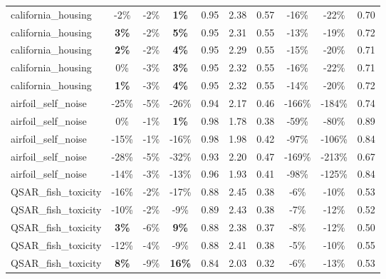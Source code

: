 \begin{table}[!htbp]
\begin{small}
\begin{sc}
{\begin{tabular}{lccccccccc}
california\_housing & -2\% & -2\% & \textbf{1\%} & 0.95 & 2.38 & 0.57 & -16\% & -22\% & 0.70 \\
california\_housing & \textbf{3\%} & -2\% & \textbf{5\%} & 0.95 & 2.31 & 0.55 & -13\% & -19\% & 0.72 \\
california\_housing & \textbf{2\%} & -2\% & \textbf{4\%} & 0.95 & 2.29 & 0.55 & -15\% & -20\% & 0.71 \\
california\_housing & 0\% & -3\% & \textbf{3\%} & 0.95 & 2.32 & 0.55 & -16\% & -22\% & 0.71 \\
california\_housing & \textbf{1\%} & -3\% & \textbf{4\%} & 0.95 & 2.32 & 0.55 & -14\% & -20\% & 0.72 \\
airfoil\_self\_noise & -25\% & -5\% & -26\% & 0.94 & 2.17 & 0.46 & -166\% & -184\% & 0.74 \\
airfoil\_self\_noise & 0\% & -1\% & \textbf{1\%} & 0.98 & 1.78 & 0.38 & -59\% & -80\% & 0.89 \\
airfoil\_self\_noise & -15\% & -1\% & -16\% & 0.98 & 1.98 & 0.42 & -97\% & -106\% & 0.84 \\
airfoil\_self\_noise & -28\% & -5\% & -32\% & 0.93 & 2.20 & 0.47 & -169\% & -213\% & 0.67 \\
airfoil\_self\_noise & -14\% & -3\% & -13\% & 0.96 & 1.93 & 0.41 & -98\% & -125\% & 0.84 \\
QSAR\_fish\_toxicity & -16\% & -2\% & -17\% & 0.88 & 2.45 & 0.38 & -6\% & -10\% & 0.53 \\
QSAR\_fish\_toxicity & -10\% & -2\% & -9\% & 0.89 & 2.43 & 0.38 & -7\% & -12\% & 0.52 \\
QSAR\_fish\_toxicity & \textbf{3\%} & -6\% & \textbf{9\%} & 0.88 & 2.38 & 0.37 & -8\% & -12\% & 0.50 \\
QSAR\_fish\_toxicity & -12\% & -4\% & -9\% & 0.88 & 2.41 & 0.38 & -5\% & -10\% & 0.55 \\
QSAR\_fish\_toxicity & \textbf{8\%} & -9\% & \textbf{16\%} & 0.84 & 2.03 & 0.32 & -6\% & -13\% & 0.53 \\
\bottomrule
\end{tabular}
}
\end{sc}
\end{small}
\end{table}
